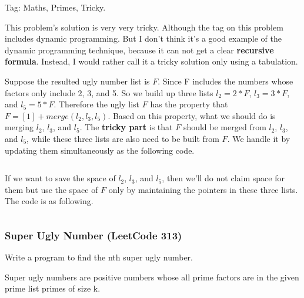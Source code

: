 \documentclass[11pt]{article}
\begin{document}
Tag: Maths, Primes, Tricky.

This problem's solution is very very tricky.
Although the tag on this problem includes dynamic programming. 
But I don't think it's a good example of the dynamic programming technique, because it can not get a clear \textbf{recursive formula}.
Instead, I would rather call it a tricky solution only using a tabulation. 

Suppose the resulted ugly number list is $F$. 
Since F includes the numbers whose factors only include 2, 3, and 5. 
So we build up three lists $l_2=2*F$, $l_3=3*F$, and $l_5=5*F$.
Therefore the ugly list $F$ has the property that $F=[1]+ merge(l_2,l_3,l_5)$.
Based on this property, what we should do is merging $l_2$, $l_3$, and $l_5$. 
The \textbf{tricky part} is that $F$ should be merged from $l_2$, $l_3$, and $l_5$, while these three lists are also need to be built from $F$.
We handle it by updating them simultaneously as the following code. 

\inputminted[breaklines=true,frame=leftline, linenos=true]{python}{src/uglyNumberII.py}

If we want to save the space of $l_2$, $l_3$, and $l_5$, then we'll do not claim space for them but use the space of $F$ only by maintaining the pointers in these three lists. The code is as following.
\inputminted[breaklines=true,frame=leftline, linenos=true]{python}{src/uglyNumberII_singleList.py}


\subsubsection{Super Ugly Number (LeetCode 313)}
Write a program to find the nth super ugly number.

Super ugly numbers are positive numbers whose all prime factors are in the given prime list primes of size k.
\end{document}
